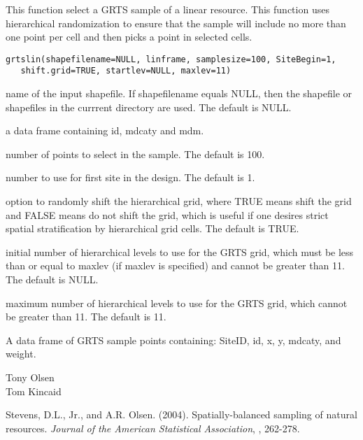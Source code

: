 \begin{Description}\relax
This function select a GRTS sample of a linear resource.  This function uses
hierarchical randomization to ensure that the sample will include no more
than one point per cell and then picks a point in selected cells.
\end{Description}
\begin{Usage}
\begin{verbatim}
grtslin(shapefilename=NULL, linframe, samplesize=100, SiteBegin=1,
   shift.grid=TRUE, startlev=NULL, maxlev=11)
\end{verbatim}
\end{Usage}
\begin{Arguments}
\begin{ldescription}
\item[\code{shapefilename}] name of the input shapefile.  If shapefilename equals
NULL, then the shapefile or shapefiles in the currrent directory are used.
The default is NULL.
\item[\code{linframe}] a data frame containing id, mdcaty and mdm.
\item[\code{samplesize}] number of points to select in the sample.  The default is
100.
\item[\code{SiteBegin}] number to use for first site in the design.  The default is
1.
\item[\code{shift.grid}] option to randomly shift the hierarchical grid, where TRUE
means shift the grid and FALSE means do not shift the grid, which is
useful if one desires strict spatial stratification by hierarchical grid
cells.  The default is TRUE.
\item[\code{startlev}] initial number of hierarchical levels to use for the GRTS
grid, which must be less than or equal to maxlev (if maxlev is specified)
and cannot be greater than 11.  The default is NULL.
\item[\code{maxlev}] maximum number of hierarchical levels to use for the GRTS grid,
which cannot be greater than 11.  The default is 11.
\end{ldescription}
\end{Arguments}
\begin{Value}
A data frame of GRTS sample points containing: SiteID, id, x, y, mdcaty,
and weight.
\end{Value}
\begin{Author}\relax
Tony Olsen \\
Tom Kincaid 
\end{Author}
\begin{References}\relax
Stevens, D.L., Jr., and A.R. Olsen. (2004). Spatially-balanced sampling of
natural resources. \emph{Journal of the American Statistical Association}, ,
262-278.
\end{References}
\begin{SeeAlso}\relax
{}
\end{SeeAlso}

